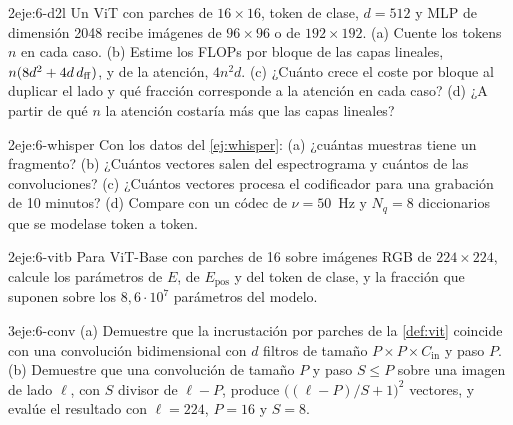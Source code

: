 \begin{ejercicio}{2}{eje:6-d2l}
Un ViT con parches de $16\times 16$, token de clase, $d=512$ y MLP de dimensión 2048 recibe imágenes de $96\times 96$ o de $192\times 192$. (a) Cuente los tokens $n$ en cada caso. (b) Estime los FLOPs por bloque de las capas lineales, $n(8d^{2}+4d\,d_{\mathrm{ff}})$, y de la atención, $4n^{2}d$. (c) ¿Cuánto crece el coste por bloque al duplicar el lado y qué fracción corresponde a la atención en cada caso? (d) ¿A partir de qué $n$ la atención costaría más que las capas lineales?
\end{ejercicio}

\begin{ejercicio}{2}{eje:6-whisper}
Con los datos del \cref{ej:whisper}: (a) ¿cuántas muestras tiene un fragmento? (b) ¿Cuántos vectores salen del espectrograma y cuántos de las convoluciones? (c) ¿Cuántos vectores procesa el codificador para una grabación de 10 minutos? (d) Compare con un códec de $\nu=50$~Hz y $N_q=8$ diccionarios que se modelase token a token.
\end{ejercicio}

\begin{ejercicio}{2}{eje:6-vitb}
Para ViT-Base con parches de 16 sobre imágenes RGB de $224\times 224$, calcule los parámetros de $E$, de $E_{\mathrm{pos}}$ y del token de clase, y la fracción que suponen sobre los $8{,}6\cdot 10^{7}$ parámetros del modelo.
\end{ejercicio}

\begin{ejercicio}{3}{eje:6-conv}
(a) Demuestre que la incrustación por parches de la \cref{def:vit} coincide con una convolución bidimensional con $d$ filtros de tamaño $P\times P\times C_{\mathrm{in}}$ y paso $P$. (b) Demuestre que una convolución de tamaño $P$ y paso $S\le P$ sobre una imagen de lado $\ell$, con $S$ divisor de $\ell-P$, produce $\bigl((\ell-P)/S+1\bigr)^{2}$ vectores, y evalúe el resultado con $\ell=224$, $P=16$ y $S=8$.
\end{ejercicio}
